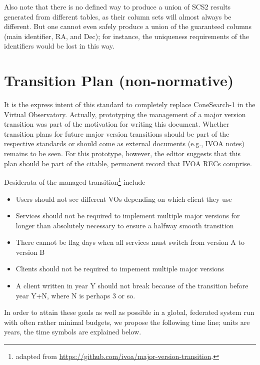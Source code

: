 \documentclass[11pt,a4paper]{ivoa}
\begin{document}
Also note that there is no defined way to produce a union of SCS2
results generated from different tables, as their
column sets will almost always be different.
But one cannot even safely produce a
union of the guaranteed columns (main identifier, RA, and Dec); for
instance, the uniqueness requirements of the identifiers would be lost
in this way.


\section{Transition Plan (non-normative)}

It is the express intent of this standard to completely replace
ConeSearch-1 in the Virtual Observatory.  Actually, prototyping the
management of a major version transition was part of the motivation for
writing this document.  Whether transition plans for future major
version transitions should be part of the respective standards or should
come as external documents (e.g., IVOA notes) remains to be seen.  For
this prototype, however, the editor suggests that this plan should be
part of the citable, permanent record that IVOA RECs comprise.

Desiderata of the managed transition\footnote{adapted from
\url{https://github.com/ivoa/major-version-transition}.} include

\begin{itemize}
\item Users should not see different VOs depending on which client they
use
\item Services should not be required to implement multiple major
versions for longer than absolutely necessary to ensure a halfway smooth
transition
\item There cannot be flag days when all services must switch from
version A to version B
\item Clients should not be required to impement multiple major versions
\item A client written in year Y should not break because of the
transition before year Y+N, where N is perhaps 3 or so.
\end{itemize}

In order to attain these goals as well as possible in a global,
federated system run with often rather minimal budgets, we propose the
following time line; units are years, the time symbols are explained
below.

\def\ts#1{$T_\textrm{\textnormal{\footnotesize #1}}$}
\end{document}
